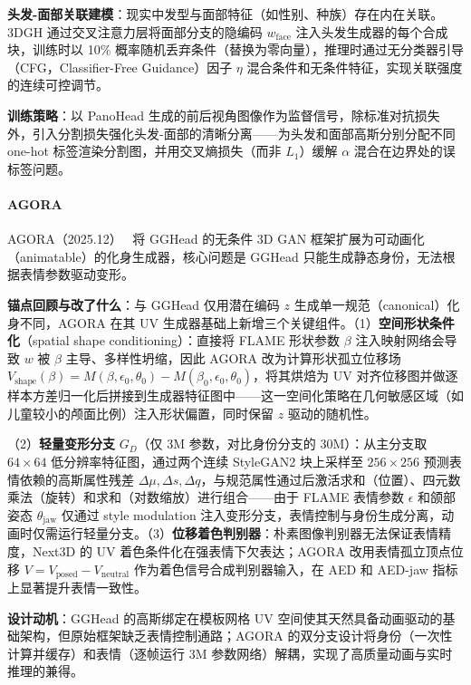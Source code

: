 \textbf{头发-面部关联建模}：现实中发型与面部特征（如性别、种族）存在内在关联。3DGH 通过交叉注意力层将面部分支的隐编码 $w_{\mathrm{face}}$ 注入头发生成器的每个合成块，训练时以 10\% 概率随机丢弃条件（替换为零向量），推理时通过无分类器引导（CFG，Classifier-Free Guidance）因子 $\eta$ 混合条件和无条件特征，实现关联强度的连续可控调节。

\textbf{训练策略}：以 PanoHead 生成的前后视角图像作为监督信号，除标准对抗损失外，引入分割损失强化头发-面部的清晰分离——为头发和面部高斯分别分配不同 one-hot 标签渲染分割图，并用交叉熵损失（而非 $L_1$）缓解 $\alpha$ 混合在边界处的误标签问题。

\paragraph{AGORA}

AGORA（2025.12）~\cite{2512_06438} 将 GGHead 的无条件 3D GAN 框架扩展为可动画化（animatable）的化身生成器，核心问题是 GGHead 只能生成静态身份，无法根据表情参数驱动变形。

\textbf{锚点回顾与改了什么}：与 GGHead 仅用潜在编码 $z$ 生成单一规范（canonical）化身不同，AGORA 在其 UV 生成器基础上新增三个关键组件。（1）\textbf{空间形状条件化}（spatial shape conditioning）：直接将 FLAME 形状参数 $\beta$ 注入映射网络会导致 $w$ 被 $\beta$ 主导、多样性坍缩，因此 AGORA 改为计算形状孤立位移场 $V_{\text{shape}}(\beta) = M(\beta, \epsilon_0, \theta_0) - M(\beta_0, \epsilon_0, \theta_0)$，将其烘焙为 UV 对齐位移图并做逐样本方差归一化后拼接到生成器特征图中——这一空间化策略在几何敏感区域（如儿童较小的颅面比例）注入形状偏置，同时保留 $z$ 驱动的随机性。

（2）\textbf{轻量变形分支} $G_D$（仅 3M 参数，对比身份分支的 30M）：从主分支取 $64 \times 64$ 低分辨率特征图，通过两个连续 StyleGAN2 块上采样至 $256 \times 256$ 预测表情依赖的高斯属性残差 $\Delta\mu, \Delta s, \Delta q$，与规范属性通过后激活求和（位置）、四元数乘法（旋转）和求和（对数缩放）进行组合——由于 FLAME 表情参数 $\epsilon$ 和颌部姿态 $\theta_{\text{jaw}}$ 仅通过 style modulation 注入变形分支，表情控制与身份生成分离，动画时仅需运行轻量分支。（3）\textbf{位移着色判别器}：朴素图像判别器无法保证表情精度，Next3D 的 UV 着色条件化在强表情下欠表达；AGORA 改用表情孤立顶点位移 $V = V_{\text{posed}} - V_{\text{neutral}}$ 作为着色信号合成判别器输入，在 AED 和 AED-jaw 指标上显著提升表情一致性。

\textbf{设计动机}：GGHead 的高斯绑定在模板网格 UV 空间使其天然具备动画驱动的基础架构，但原始框架缺乏表情控制通路；AGORA 的双分支设计将身份（一次性计算并缓存）和表情（逐帧运行 3M 参数网络）解耦，实现了高质量动画与实时推理的兼得。

